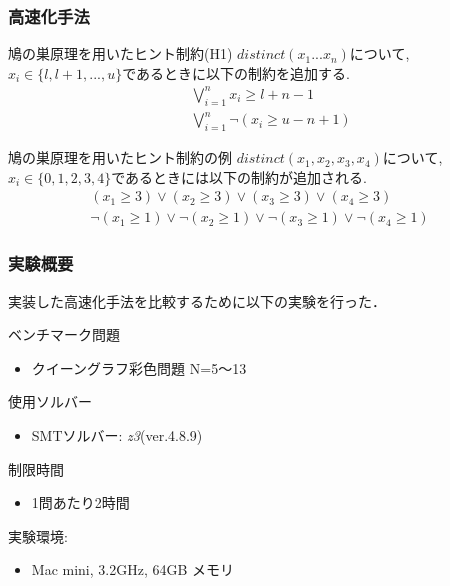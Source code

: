 \documentclass [dvipdfmx,11pt]{beamer}
\begin{document}
\begin{frame}
    \frametitle{高速化手法}
    \vspace{-3mm}
    \begin{block}{鳩の巣原理を用いたヒント制約(H1)}
        $distinct(x_1 ... x_n)$について, $x_i \in \{l, l+1, ..., u\}$であるときに以下の制約を追加する.
        \vspace{-3mm}
        \begin{eqnarray*}
            && \bigvee_{i=1}^n   x_i \geq l+n-1\\
            && \bigvee_{i=1}^n \lnot(x_i \geq u-n+1)
        \end{eqnarray*}
    \end{block}
    \begin{exampleblock}{鳩の巣原理を用いたヒント制約の例}
        $distinct(x_1, x_2, x_3, x_4)$について, $x_i \in \{0,1,2,3,4\}$であるときには以下の制約が追加される.\\
        \vspace{-3mm}
        \begin{eqnarray*}
            (x_1 \geq 3) \lor (x_2 \geq 3) \lor (x_3 \geq 3) \lor (x_4 \geq 3)\\
        \lnot(x_1 \geq 1) \lor \lnot(x_2 \geq 1) \lor \lnot(x_3 \geq 1) \lor \lnot(x_4 \geq 1)
        \end{eqnarray*}
    \end{exampleblock}
\end{frame}





\begin{frame}
    \frametitle{実験概要}
    実装した高速化手法を比較するために以下の実験を行った．
    \begin{block}{}
    ベンチマーク問題
    \begin{itemize}
        \item クイーングラフ彩色問題 N=5〜13
    \end{itemize}
    使用ソルバー
    \begin{itemize}
        \item SMTソルバー: \textit{z3}(ver.4.8.9)
    \end{itemize}
    制限時間
    \begin{itemize}
        \item 1問あたり2時間
    \end{itemize}
    実験環境:
    \begin{itemize}
        \item Mac mini,  3.2GHz,  64GB メモリ
    \end{itemize}
    \end{block}
\end{frame}
\end{document}
